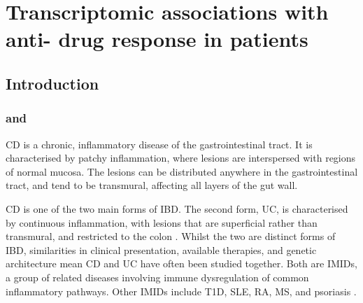 %
%

\chapter{Transcriptomic associations with anti- drug response in  patients}
\label{ch:multiPANTS}




\section{Introduction}

\subsection{ and }

\gls{CD} is a chronic, inflammatory disease of the gastrointestinal tract.
It is characterised by patchy inflammation, where lesions are interspersed with regions of normal mucosa. 
The lesions can be distributed anywhere in the gastrointestinal tract, and tend to be transmural, affecting all layers of the gut wall.

\gls{CD} is one of the two main forms of \gls{IBD}.
The second form, \gls{UC}, is characterised by continuous inflammation, with lesions that are superficial rather than transmural, and restricted to the colon \autocite{roda2020CrohnDisease}.
Whilst the two are distinct forms of \gls{IBD}, similarities in clinical presentation, available therapies, and genetic architecture mean \gls{CD} and \gls{UC} have often been studied together.
Both are \glspl{IMID}, a group of related diseases involving immune dysregulation of common inflammatory pathways.
Other \glspl{IMID} include \gls{T1D}, \gls{SLE}, \gls{RA}, \gls{MS}, and psoriasis \autocite{cotsapas2013ImmunemediatedDiseaseGenetics,david2018GeneticsImmunemediatedInflammatory}.

